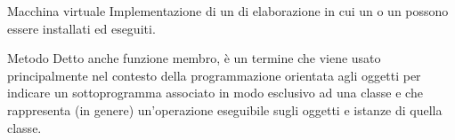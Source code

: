 \elemento
{Macchina virtuale} 
{Implementazione  di un  di elaborazione in cui un  o un  possono essere installati ed eseguiti.}

\elemento
{Metodo}
{Detto anche funzione membro, è un termine che viene usato principalmente nel contesto della programmazione orientata agli oggetti per indicare un sottoprogramma associato in modo esclusivo ad una classe e che rappresenta (in genere) un'operazione eseguibile sugli oggetti e istanze di quella classe.}
